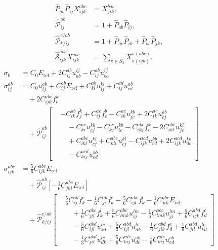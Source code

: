 \begin{align}
\widehat P_{ab}\widehat P_{ij}X^{abc}_{ijk} &= X^{bac}_{jik}, \\
\widehat{\mathcal P}^{ab}_{ij} &= 1+\widehat P_{ab}\widehat P_{ij}, \\
\widehat{\mathcal P}^{c/ab}_{k/ij} &= 1+\widehat P_{ac}\widehat P_{ik}+\widehat P_{bc}\widehat P_{jk}, \\
\widehat{\mathcal S}^{abc}_{ijk}X^{abc}_{ijk} &= \sum_{\pi\in S_3}X^{\pi(abc)}_{\pi(ijk)}.
\end{align}
\begin{align}
\sigma_{0} &= C_{0} E_{\mathrm{ref}} + 2 C^{ab}_{ij} u^{ij}_{ab} - C^{ab}_{ij} u^{ij}_{ba} \\
\sigma^{ab}_{ij} &= C_{0} u^{ab}_{ij} + C^{ab}_{ij} E_{\mathrm{ref}} + C^{ab}_{kl} u^{kl}_{ij} + C^{cd}_{ij} u^{ab}_{cd} \\
&\quad {}+ 2 C^{abc}_{ijk} f^{k}_{c} \\
&\quad {}+ \widehat{\mathcal P}^{ab}_{ij}\left[\begin{aligned}& -C^{ab}_{ik} f^{k}_{j} + C^{ac}_{ij} f^{b}_{c} - C^{ac}_{ik} u^{kb}_{jc} + 2 C^{ac}_{ik} u^{kb}_{cj} \\ &\quad -C^{ac}_{ki} u^{kb}_{cj} - C^{ac}_{kj} u^{kb}_{ic} - C^{abc}_{ikj} f^{k}_{c} - 2 C^{abc}_{ikl} u^{kl}_{jc} \\ &\quad {}+ C^{abc}_{ikl} u^{kl}_{cj} + C^{abc}_{kli} u^{kl}_{cj} - C^{acd}_{ijk} u^{kb}_{cd} + 2 C^{acd}_{ijk} u^{kb}_{dc} \\ &\quad -C^{acd}_{kij} u^{kb}_{cd}\end{aligned}\right] \\
\sigma^{abc}_{ijk} &= \frac{5}{6} C^{abc}_{ijk} E_{\mathrm{ref}} \\
&\quad {}+ \widehat{\mathcal P}^{ab}_{ij}\left[ -\frac{1}{6} C^{abc}_{jki} E_{\mathrm{ref}} \right] \\
&\quad {}+ \widehat{\mathcal P}^{c/ab}_{k/ij}\left[\begin{aligned}& \frac{5}{6} C^{ab}_{ij} f^{c}_{k} - \frac{1}{6} C^{ab}_{ji} f^{c}_{k} - \frac{5}{6} C^{abc}_{ijl} f^{l}_{k} - \frac{1}{6} C^{abc}_{jik} E_{\mathrm{ref}} \\ &\quad {}+ \frac{1}{6} C^{abc}_{jil} f^{l}_{k} + \frac{5}{6} C^{abc}_{lmk} u^{lm}_{ij} - \frac{1}{6} C^{abc}_{lmk} u^{lm}_{ji} + \frac{5}{6} C^{abd}_{ijk} f^{c}_{d} \\ &\quad -\frac{5}{6} C^{abd}_{ijl} u^{lc}_{kd} + \frac{5}{3} C^{abd}_{ijl} u^{lc}_{dk} - \frac{1}{6} C^{abd}_{jik} f^{c}_{d} + \frac{1}{6} C^{abd}_{jil} u^{lc}_{kd} \\ &\quad -\frac{1}{3} C^{abd}_{jil} u^{lc}_{dk} + \frac{5}{6} C^{cde}_{kij} u^{ab}_{de} - \frac{1}{6} C^{cde}_{kij} u^{ab}_{ed}\end{aligned}\right] \\

\end{align}
